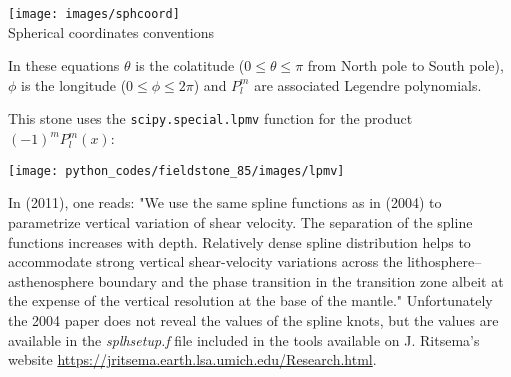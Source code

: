 \begin{center}
\texttt{[image: images/sphcoord]}\\
{\captionfont Spherical coordinates conventions}
\end{center}

In these equations $\theta$ is the colatitude ($0\le\theta\le \pi$ from North pole to South pole), $\phi$
is the longitude ($0\le\phi\le 2\pi$) and $P_l^m$ are associated Legendre polynomials. 

This stone uses the {\tt scipy.special.lpmv} function for the product $(-1)^m P_l^m(x)$:
\begin{center}
\texttt{[image: python\_codes/fieldstone\_85/images/lpmv]}
\end{center}

In \textcite{ridv11} (2011), one reads: "We use the same 
spline functions as in \textcite{rivw04} (2004) to parametrize vertical 
variation of shear velocity. The separation of the spline functions
increases with depth. Relatively dense spline distribution helps to
accommodate strong vertical shear-velocity variations across the
lithosphere–asthenosphere boundary and the phase transition in the
transition zone albeit at the expense of the vertical resolution at
the base of the mantle."
Unfortunately the 2004 paper does not reveal the values of the spline knots, but the values
are available in the {\sl splhsetup.f} file included in the tools available 
on J. Ritsema's website \url{https://jritsema.earth.lsa.umich.edu/Research.html}.

